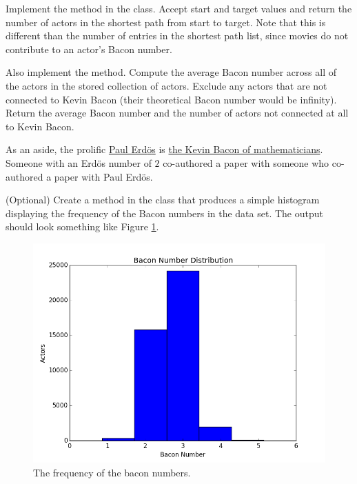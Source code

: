 \begin{problem}
Implement the  method in the  class.
Accept start and target values and return the number of actors in the shortest path from start to target.
Note that this is different than the number of entries in the shortest path list, since movies do not contribute to an actor's Bacon number.

Also implement the  method.
Compute the average Bacon number across all of the actors in the stored collection of actors.
Exclude any actors that are not connected to Kevin Bacon (their theoretical Bacon number would be infinity).
Return the average Bacon number and the number of actors not connected at all to Kevin Bacon.
\end{problem}

As an aside, the prolific \href{https://en.wikipedia.org/wiki/Paul_Erd%C5%91s}{Paul Erd{\"o}s} is \href{https://xkcd.com/599/}{the Kevin Bacon of mathematicians}.
Someone with an Erd{\"o}s number of $2$ co-authored a paper with someone who co-authored a paper with Paul Erd{\"o}s.

\begin{problem}
(Optional) Create a  method in the  class that produces a simple histogram displaying the frequency of the Bacon numbers in the data set.
The output should look something like Figure \ref{fig:bacon_numbers}.
\begin{figure}[H]
\includegraphics[width=\textwidth]{baconDistribution.png}
\caption{The frequency of the bacon numbers.}
\label{fig:bacon_numbers}
\end{figure}
\end{problem}

